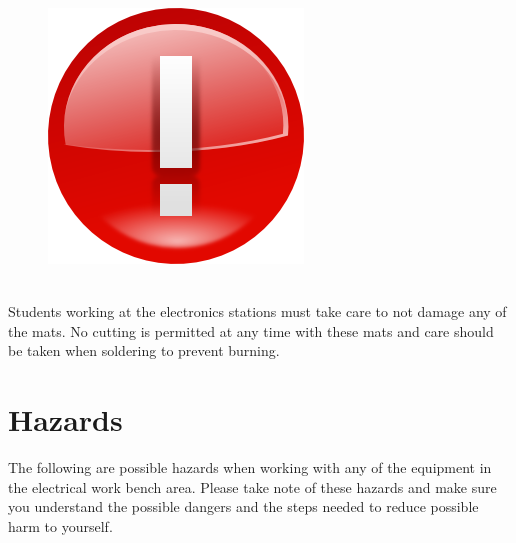 \begin{framed}
\begin{figure}
\includegraphics[width=\linewidth]{images/important_icon.png}
\end{figure}
\ \\
Students working at the electronics stations must take care to not damage any of the mats.  No cutting is permitted at any time with these mats and care should be taken when soldering to prevent burning.
\end{framed}

\section{Hazards}
The following are possible hazards when working with any of the equipment in the electrical work bench area.  Please take note of these hazards and make sure you understand the possible dangers and the steps needed to reduce possible harm to yourself.

